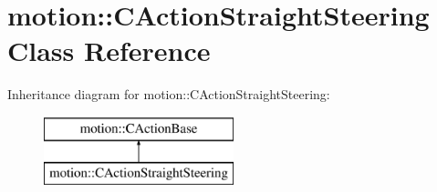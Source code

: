 \hypertarget{classmotion_1_1CActionStraightSteering}{}\section{motion\+:\+:C\+Action\+Straight\+Steering Class Reference}
\label{classmotion_1_1CActionStraightSteering}
Inheritance diagram for motion\+:\+:C\+Action\+Straight\+Steering\+:\begin{figure}[H]
\begin{center}
\leavevmode
\includegraphics[height=2.000000cm]{classmotion_1_1CActionStraightSteering}
\end{center}
\end{figure}
